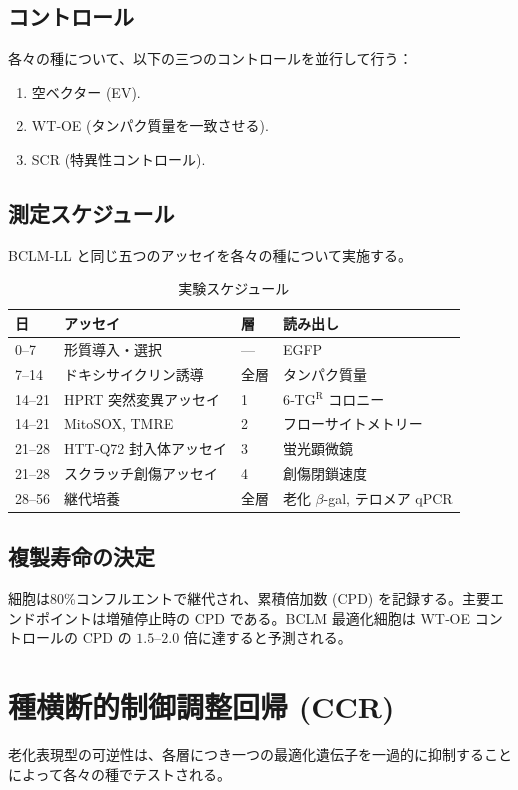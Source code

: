 \documentclass[12pt,a4paper]{ltjsarticle}
\begin{document}
	\subsection{コントロール}
	各々の種について、以下の三つのコントロールを並行して行う：
	\begin{enumerate}
		\item 空ベクター (EV).
		\item WT‑OE (タンパク質量を一致させる).
		\item SCR (特異性コントロール).
	\end{enumerate}
	
	\subsection{測定スケジュール}
	BCLM‑LL と同じ五つのアッセイを各々の種について実施する。
	
	\begin{table}[H]
		\centering
		\caption{実験スケジュール}
		\label{tab:schedule}
		\begin{tabular}{@{}llll@{}}
			\toprule
			\textbf{日} & \textbf{アッセイ} & \textbf{層} & \textbf{読み出し} \\
			\midrule
			0–7   & 形質導入・選択 & --- & EGFP \\
			7–14  & ドキシサイクリン誘導 & 全層 & タンパク質量 \\
			14–21 & HPRT 突然変異アッセイ & 1 & 6‑TG\(^{\mathrm{R}}\) コロニー \\
			14–21 & MitoSOX, TMRE & 2 & フローサイトメトリー \\
			21–28 & HTT‑Q72 封入体アッセイ & 3 & 蛍光顕微鏡 \\
			21–28 & スクラッチ創傷アッセイ & 4 & 創傷閉鎖速度 \\
			28–56 & 継代培養 & 全層 & 老化 \(\beta\)-gal, テロメア qPCR \\
			\bottomrule
		\end{tabular}
	\end{table}
	
	\subsection{複製寿命の決定}
	細胞は80\%コンフルエントで継代され、累積倍加数 (CPD) を記録する。主要エンドポイントは増殖停止時の CPD である。BCLM 最適化細胞は WT‑OE コントロールの CPD の \(1.5\)–\(2.0\) 倍に達すると予測される。
	
	\section{種横断的制御調整回帰 (CCR)}
	\label{sec:CCR}
	老化表現型の可逆性は、各層につき一つの最適化遺伝子を一過的に抑制することによって各々の種でテストされる。
	
\end{document}
